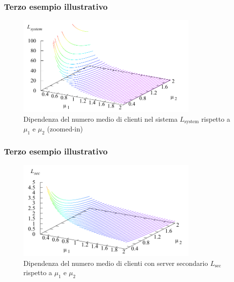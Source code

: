 \documentclass{beamer}
\begin{document}
\begin{frame}
    \frametitle{Terzo esempio illustrativo}
    \begin{figure}[h]
        \centering
        \includegraphics[width=0.8\textwidth]{CBOSr9C.png}
        \caption{Dipendenza del numero medio di clienti nel sistema $L_{\mathrm{system}}$ rispetto a $\mu_1$ e $\mu_2$ (zoomed-in)}
    \end{figure}
\end{frame}




\begin{frame}
    \frametitle{Terzo esempio illustrativo}
    \begin{figure}[h]
        \centering
        \includegraphics[width=0.8\textwidth]{R1VGHAR.png}
        \caption{Dipendenza del numero medio di clienti con server secondario $L_{\mathrm{sec}}$ rispetto a $\mu_1$ e $\mu_2$}
    \end{figure}
\end{frame}
\end{document}
